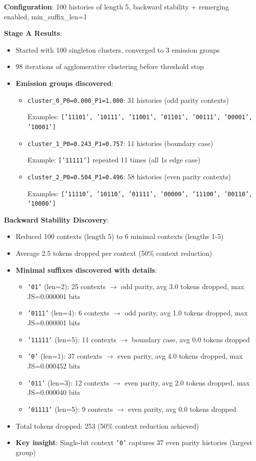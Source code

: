 \documentclass[11pt]{article}
\begin{document}
\begin{resultbox}
\textbf{Configuration}: 100 histories of length 5, backward stability + remerging enabled, min\_suffix\_len=1

\textbf{Stage A Results}:
\begin{itemize}
\item Started with 100 singleton clusters, converged to 3 emission groups
\item 98 iterations of agglomerative clustering before threshold stop
\item \textbf{Emission groups discovered}:
  \begin{itemize}
  \item \texttt{cluster\_0\_P0=0.000\_P1=1.000}: 31 histories (odd parity contexts)

    Examples: \texttt{['11101', '10111', '11001', '01101', '00111', '00001', '10001']}
  \item \texttt{cluster\_1\_P0=0.243\_P1=0.757}: 11 histories (boundary case)

    Example: \texttt{['11111']} repeated 11 times (all 1s edge case)
  \item \texttt{cluster\_2\_P0=0.504\_P1=0.496}: 58 histories (even parity contexts)

    Examples: \texttt{['11110', '10110', '01111', '00000', '11100', '00110', '10000']}
  \end{itemize}
\end{itemize}

\textbf{Backward Stability Discovery}:
\begin{itemize}
\item Reduced 100 contexts (length 5) to 6 minimal contexts (lengths 1-5)
\item Average 2.5 tokens dropped per context (50\% context reduction)
\item \textbf{Minimal suffixes discovered with details}:
  \begin{itemize}
  \item \texttt{'01'} (len=2): 25 contexts $\rightarrow$ odd parity, avg 3.0 tokens dropped, max JS=0.000001 bits
  \item \texttt{'0111'} (len=4): 6 contexts $\rightarrow$ odd parity, avg 1.0 tokens dropped, max JS=0.000001 bits
  \item \texttt{'11111'} (len=5): 11 contexts $\rightarrow$ boundary case, avg 0.0 tokens dropped
  \item \texttt{'0'} (len=1): 37 contexts $\rightarrow$ even parity, avg 4.0 tokens dropped, max JS=0.000452 bits
  \item \texttt{'011'} (len=3): 12 contexts $\rightarrow$ even parity, avg 2.0 tokens dropped, max JS=0.000040 bits
  \item \texttt{'01111'} (len=5): 9 contexts $\rightarrow$ even parity, avg 0.0 tokens dropped
  \end{itemize}
\item Total tokens dropped: 253 (50\% context reduction achieved)
\item \textbf{Key insight}: Single-bit context \texttt{'0'} captures 37 even parity histories (largest group)
\end{itemize}


\end{resultbox}
\end{document}

